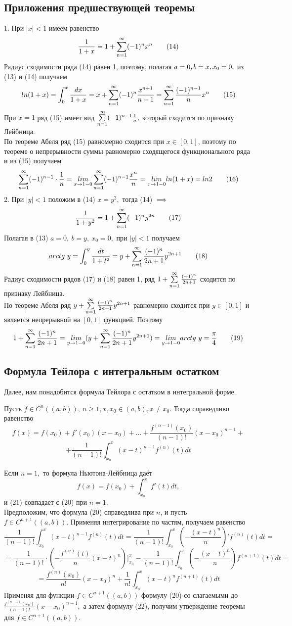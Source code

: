 \documentclass[main]{subfiles}
\begin{document}
\subsection{Приложения предшествующей теоремы}
1. При $|x|<1$ имеем равенство \[\frac{1}{1+x}=1+\sum\limits_{n=1}^\infty(-1)^nx^n\tag{14}\]
Радиус сходимости ряда (14) равен 1, поэтому, полагая $a=0, b=x,\\ x_0=0,$ из (13) и (14) получаем
\[ ln(1+x)=\int_0^x\frac{dx}{1+x}=x+\sum\limits_{n=1}^\infty(-1)^n\frac{x^{n+1}}{n+1}=\sum\limits_{n=1}^\infty \frac{(-1)^{n-1}}{n}x^n\tag{15} \]
При $x=1$ ряд (15) имеет вид $\sum\limits_{n=1}^\infty (-1)^{n-1}\frac{1}{n},$ который сходится по признаку Лейбница.\\
По теореме Абеля ряд (15) равномерно сходится при $x\in [0,1]$, поэтому по теореме о непрерывности суммы равномерно сходящегося функционального ряда и из (15) получаем
\[ \sum\limits_{n=1}^\infty (-1)^{n-1}\cdot\frac{1}{n}=\underset{x\to 1-0}{lim}\sum\limits_{n=1}^\infty (-1)^{n-1}\frac{x^n}{n}=\underset{x\to 1-0}{lim} ln(1+x)=ln2\tag{16} \]
2. При $|y|<1$ положим в (14) $x=y^2,$ тогда (14) $\implies$ \[ \frac{1}{1+y^2}=1+\sum\limits_{n=1}^\infty (-1)^ny^{2n}\tag{17} \]
Полагая в (13) $a=0,\ b=y,\ x_0=0,$ при $|y|<1$ получаем \[ arctg\ y=\int_0^y \frac{dt}{1+t^2}=y+\sum\limits_{n=1}^\infty\frac{(-1)^n}{2n+1}y^{2n+1}\tag{18} \]
Радиус сходимости рядов (17) и (18) равен 1, ряд $1+\sum\limits_{n=1}^\infty\frac{(-1)^n}{2n+1}$ сходится по признаку Лейбница.\\
По теореме Абеля ряд $y+\sum\limits_{n=1}^\infty \frac{(-1)^n}{2n+1}y^{2n+1}$ равномерно сходится при $y\in[0,1]$ и является непрерывной на $[0,1]$ функцией. Поэтому \[ 1+\su\frac{(-1)^n}{2n+1}=\lims{y\to 1-0}(y+\su\frac{(-1)^n}{2n+1}y^{2n+1})=\lims{y\to 1-0}arctg\ y=\frac{\pi}{4}\tag{19} \]
 \subsection{Формула Тейлора с интегральным остатком}
 Далее, нам понадобится формула Тейлора с остатком в интегральной форме.\\
 \begin{theorem} Пусть $f\in C^n((a,b)),\ n\geq 1, x, x_0\in (a,b), x\ne x_0.$ Тогда справедливо равенство
 \[ f(x)=f(x_0)+f'(x_0)(x-x_0)+\dots+\frac{f^{(n-1)}(x_0)}{(n-1)!}(x-x_0)^{n-1}+\]\[+\frac{1}{(n-1)!}\int_{x_0}^{x}(x-t)^{n-1}f^{(n)}(t)dt\tag{20} \] \end{theorem}
 \begin{longProof}[по индукции]
 Если $n=1,$ то формула Ньютона-Лейбница даёт \[ f(x)=f(x_0)+\int_{x_0}^x f'(t)dt, \tag{21}\]
 и (21) совпадает с (20) при $n=1.$\\
 Предположим, что формула (20) справедлива при $n$, и пусть $f\in C^{n+1}((a,b)).$
  Применяя интегрирование по частям, получаем равенство 
  \[ \frac{1}{(n-1)!}\int_{x_0}^x(x-t)^{n-1}f^{(n)}(t)dt=\frac{1}{(n-1)!}\int_{x_0}^{x}(-\frac{(x-t)^n}{n})'f^{(n)}(t)dt= \]
 \[=\frac{1}{(n-1)!}\cdot(-\frac{f^{(n)}(t)}{n}(x-t)^n)|_{x_0}^x-\frac{1}{(n-1)!}\int_{x_0}^x(-\frac{(x-t)^n}{n})f^{(n+1)}(t)dt=\]
 \[=\frac{f^{(n)}(x_0)}{n!}(x-x_0)^n+\frac{1}{n!}\int_{x_0}^x(x-t)^nf^{(n+1)}(t)dt\tag{22} \]
 Применяя для функции $f\in C^{n+1}((a,b))$ формулу (20) со слагаемыми до $\frac{f^{(n-1)}(x_0)}{(n-1)!}(x-x_0)^{n-1},$
  а затем формулу (22), получим утверждение теоремы для $f\in C^{n+1}((a,b)).$\\
 \end{longProof}
 
\end{document}

